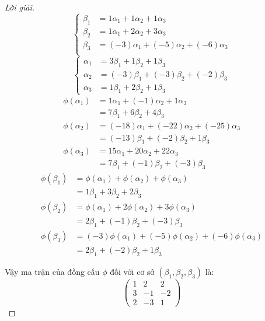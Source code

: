 \documentclass[class=linearalgebra,crop=false]{standalone}
\begin{document}
\begin{proof}[Lời giải]
    \[
        \begin{cases}
            \beta_{1} & = 1\alpha_{1} + 1\alpha_{2} + 1\alpha_{3} \\
            \beta_{2} & = 1\alpha_{1} + 2\alpha_{2} + 3\alpha_{3} \\
            \beta_{3} & = (-3)\alpha_{1} + (-5)\alpha_{2} + (-6)\alpha_{3} \\
        \end{cases}
    \]
    \[
        \begin{cases}
            \alpha_{1} & = 3\beta_{1} + 1\beta_{2} + 1\beta_{3} \\
            \alpha_{2} & = (-3)\beta_{1} + (-3)\beta_{2} + (-2)\beta_{3} \\
            \alpha_{3} & = 1\beta_{1} + 2\beta_{2} + 1\beta_{3}
        \end{cases}
    \]
    \begin{align*}
        \phi(\alpha_{1}) & = 1\alpha_{1} + (-1)\alpha_{2} + 1\alpha_{3} \\
                         & = 7\beta_{1} + 6\beta_{2} + 4\beta_{3} \\
        \phi(\alpha_{2}) & = (-18)\alpha_{1} + (-22)\alpha_{2} + (-25)\alpha_{3} \\
                         & = (-13)\beta_{1} + (-2)\beta_{2} + 1\beta_{3} \\
        \phi(\alpha_{3}) & = 15\alpha_{1} + 20\alpha_{2} + 22\alpha_{3} \\
                         & = 7\beta_{1} + (-1)\beta_{2} + (-3)\beta_{3}
    \end{align*}
    \begin{align*}
        \phi(\beta_{1}) & = \phi(\alpha_{1}) + \phi(\alpha_{2}) + \phi(\alpha_{3}) \\
                        & = 1\beta_{1} + 3\beta_{2} + 2\beta_{3} \\
        \phi(\beta_{2}) & = \phi(\alpha_{1}) + 2\phi(\alpha_{2}) + 3\phi(\alpha_{3}) \\
                        & = 2\beta_{1} + (-1)\beta_{2} + (-3)\beta_{3} \\
        \phi(\beta_{3}) & = (-3)\phi(\alpha_{1}) + (-5)\phi(\alpha_{2}) + (-6)\phi(\alpha_{3}) \\
                        & = 2\beta_{1} + (-2)\beta_{2} + 1\beta_{3}
    \end{align*}
    \par Vậy ma trận của đồng cấu $\phi$ đối với cơ sở $(\beta_{1}, \beta_{2}, \beta_{3})$ là:
    \[
        \begin{pmatrix}
            1 & 2 & 2 \\
            3 & -1 & -2 \\
            2 & -3 & 1
        \end{pmatrix}
    \]
\end{proof}
\end{document}
